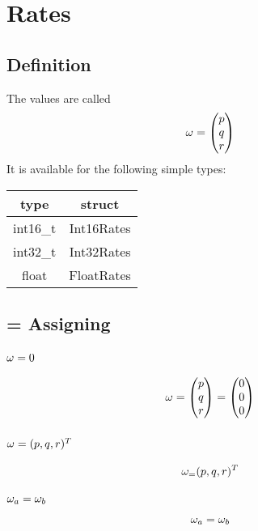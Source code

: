 \section{Rates}
\subsection{Definition}
The values are called
\begin{equation}
\omega_{} = \begin{pmatrix} p \\q\\r\end{pmatrix}
\end{equation}
It is available for the following simple types:\\
\begin{tabular}{c|c}
type		& struct		\\ \hline
int16\_t	& Int16Rates	\\
int32\_t	& Int32Rates	\\
float 		& FloatRates
\end{tabular}

\subsection{= Assigning}
\subsubsection*{$\omega_{} = 0$}
\begin{equation}
\omega_{} = \begin{pmatrix}p\\q\\r\end{pmatrix} = \begin{pmatrix}0\\0\\0\end{pmatrix}
\end{equation}

\subsubsection*{$\omega_{} = (p, q, r)^{T}$}
\begin{equation}
\omega_{=} (p, q, r)^{T}
\end{equation}

\subsubsection*{$\omega_{a} = \omega_{b}$}
\begin{equation}
\omega_{a} = \omega_{b}
\end{equation}



